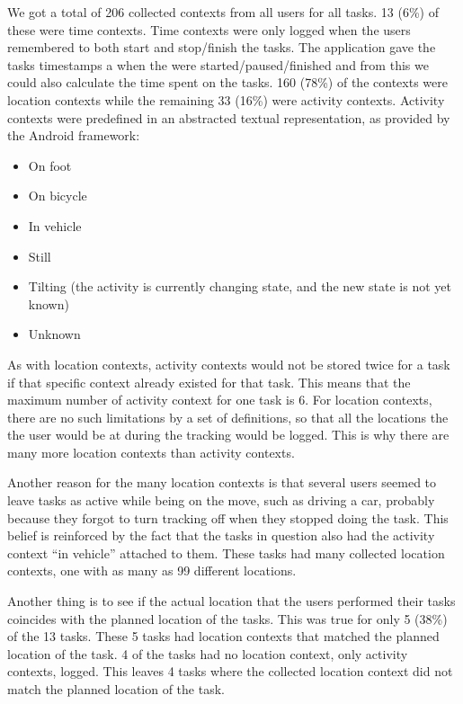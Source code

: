 We got a total of 206 collected contexts from all users for all tasks. 13 (6\%) of these were time contexts. Time contexts were only logged when the users remembered to both start and stop/finish the tasks. The application gave the tasks timestamps a when the were started/paused/finished and from this we could also calculate the time spent on the tasks. 160 (78\%) of the contexts were location contexts while the remaining 33 (16\%) were activity contexts. Activity contexts were predefined in an abstracted textual representation, as provided by the Android framework:
\begin{itemize}
	\item On foot
	\item On bicycle
	\item In vehicle
	\item Still
	\item Tilting (the activity is currently changing state, and the new state is not yet known)
	\item Unknown
\end{itemize}
As with location contexts, activity contexts would not be stored twice for a task if that specific context already existed for that task. This means that the maximum number of activity context for one task is 6. For location contexts, there are no such limitations by a set of definitions, so that all the locations the the user would be at during the tracking would be logged. This is why there are many more location contexts than activity contexts.

Another reason for the many location contexts is that several users seemed to leave tasks as active while being on the move, such as driving a car, probably because they forgot to turn tracking off when they stopped doing the task. This belief is reinforced by the fact that the tasks in question also had the activity context ``in vehicle'' attached to them. These tasks had many collected location contexts, one with as many as 99 different locations.

Another thing is to see if the actual location that the users performed their tasks coincides with the planned location of the tasks. This was true for only 5 (38\%) of the 13 tasks. These 5 tasks had location contexts that matched the planned location of the task. 4 of the tasks had no location context, only activity contexts, logged. This leaves 4 tasks where the collected location context did not match the planned location of the task.